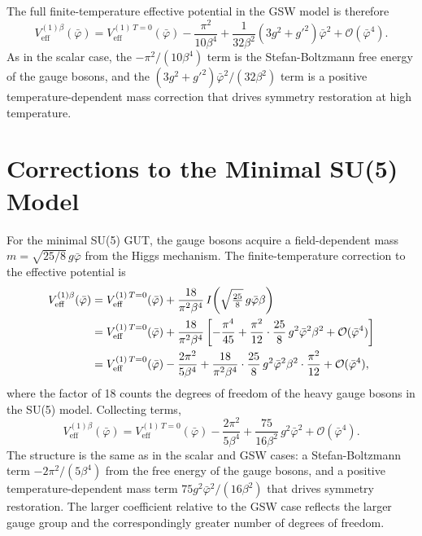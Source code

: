 The full finite-temperature effective potential in the GSW model is
therefore
\begin{equation}
	\boxed{V_{\text{eff}}^{(1)\beta}(\bar\varphi)
		= V_{\text{eff}}^{(1)\,T=0}(\bar\varphi)
		- \frac{\pi^2}{10\beta^4}
		+ \frac{1}{32\beta^2}(3g^2+g'^2)\bar\varphi^2
		+ \mathcal{O}(\bar\varphi^4).}
\end{equation}
As in the scalar case, the $-\pi^2/(10\beta^4)$ term is the
Stefan-Boltzmann free energy of the gauge bosons, and the
$(3g^2+g'^2)\bar\varphi^2/(32\beta^2)$ term is a positive
temperature-dependent mass correction that drives symmetry restoration
at high temperature.

\section{Corrections to the Minimal SU(5) Model}

For the minimal SU(5) GUT, the gauge bosons acquire a field-dependent
mass $m = \sqrt{25/8}\,g\bar\varphi$ from the Higgs mechanism. The
finite-temperature correction to the effective potential is
\begin{align}
	V_{\text{eff}}^{(1)\beta}(\bar\varphi)
	 & = V_{\text{eff}}^{(1)\,T=0}(\bar\varphi)
	+ \frac{18}{\pi^2\beta^4}
	\,I\!\left(\sqrt{\tfrac{25}{8}}\,g\bar\varphi\beta\right)
	\notag                                                               \\
	 & = V_{\text{eff}}^{(1)\,T=0}(\bar\varphi)
	+ \frac{18}{\pi^2\beta^4}\left[
		                         -\frac{\pi^4}{45}
		                         + \frac{\pi^2}{12}\cdot\frac{25}{8}
		                         \,g^2\bar\varphi^2\beta^2
		                         + \mathcal{O}(\bar\varphi^4)\right] \notag \\
	 & = V_{\text{eff}}^{(1)\,T=0}(\bar\varphi)
	- \frac{2\pi^2}{5\beta^4}
	+ \frac{18}{\pi^2\beta^4}\cdot\frac{25}{8}
	\,g^2\bar\varphi^2\beta^2\cdot\frac{\pi^2}{12}
	+ \mathcal{O}(\bar\varphi^4),
\end{align}
where the factor of 18 counts the degrees of freedom of the heavy gauge
bosons in the SU(5) model. Collecting terms,
\begin{equation}
	\boxed{V_{\text{eff}}^{(1)\beta}(\bar\varphi)
		= V_{\text{eff}}^{(1)\,T=0}(\bar\varphi)
		- \frac{2\pi^2}{5\beta^4}
		+ \frac{75}{16\beta^2}\,g^2\bar\varphi^2
		+ \mathcal{O}(\bar\varphi^4).}
\end{equation}
The structure is the same as in the scalar and GSW cases: a
Stefan-Boltzmann term $-2\pi^2/(5\beta^4)$ from the free energy of the
gauge bosons, and a positive temperature-dependent mass term
$75g^2\bar\varphi^2/(16\beta^2)$ that drives symmetry restoration. The
larger coefficient relative to the GSW case reflects the larger gauge
group and the correspondingly greater number of degrees of freedom.






